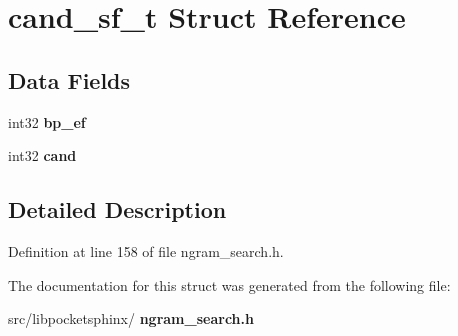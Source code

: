 \section{cand\+\_\+sf\+\_\+t Struct Reference}
\label{structcand__sf__t}
\subsection*{Data Fields}
\begin{DoxyCompactItemize}
\item 
\mbox{\label{structcand__sf__t_ab04890bd8e455c234bf78aec9dab8803}} 
int32 {\bfseries bp\+\_\+ef}
\item 
\mbox{\label{structcand__sf__t_a7fcc5ff33fe4ad1a57d1acc272a29f36}} 
int32 {\bfseries cand}
\end{DoxyCompactItemize}


\subsection{Detailed Description}


Definition at line 158 of file ngram\+\_\+search.\+h.



The documentation for this struct was generated from the following file\+:\begin{DoxyCompactItemize}
\item 
src/libpocketsphinx/\textbf{ ngram\+\_\+search.\+h}\end{DoxyCompactItemize}
